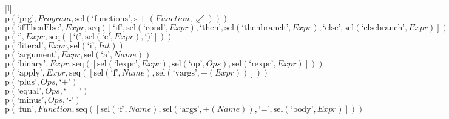 \footnotesize\begin{center}\begin{tabular}{|l|}\hline
{}
\\\hline
$\mathrm{p}(\text{`prg'},\mathit{Program},\mathrm{sel}\left(\text{`functions'},\mathrm{s}{+}\left(\mathit{Function},{\swarrow}\right)\right))$	\\
$\mathrm{p}(\text{`ifThenElse'},\mathit{Expr},\mathrm{seq}\left(\left[\text{`if'}, \mathrm{sel}\left(\text{`cond'},\mathit{Expr}\right), \text{`then'}, \mathrm{sel}\left(\text{`thenbranch'},\mathit{Expr}\right), \text{`else'}, \mathrm{sel}\left(\text{`elsebranch'},\mathit{Expr}\right)\right]\right))$	\\
$\mathrm{p}(\text{`'},\mathit{Expr},\mathrm{seq}\left(\left[\text{`('}, \mathrm{sel}\left(\text{`e'},\mathit{Expr}\right), \text{`)'}\right]\right))$	\\
$\mathrm{p}(\text{`literal'},\mathit{Expr},\mathrm{sel}\left(\text{`i'},\mathit{Int}\right))$	\\
$\mathrm{p}(\text{`argument'},\mathit{Expr},\mathrm{sel}\left(\text{`a'},\mathit{Name}\right))$	\\
$\mathrm{p}(\text{`binary'},\mathit{Expr},\mathrm{seq}\left(\left[\mathrm{sel}\left(\text{`lexpr'},\mathit{Expr}\right), \mathrm{sel}\left(\text{`op'},\mathit{Ops}\right), \mathrm{sel}\left(\text{`rexpr'},\mathit{Expr}\right)\right]\right))$	\\
$\mathrm{p}(\text{`apply'},\mathit{Expr},\mathrm{seq}\left(\left[\mathrm{sel}\left(\text{`f'},\mathit{Name}\right), \mathrm{sel}\left(\text{`vargs'},\plus \left(\mathit{Expr}\right)\right)\right]\right))$	\\
$\mathrm{p}(\text{`plus'},\mathit{Ops},\text{`+'})$	\\
$\mathrm{p}(\text{`equal'},\mathit{Ops},\text{`=='})$	\\
$\mathrm{p}(\text{`minus'},\mathit{Ops},\text{`-'})$	\\
$\mathrm{p}(\text{`fun'},\mathit{Function},\mathrm{seq}\left(\left[\mathrm{sel}\left(\text{`f'},\mathit{Name}\right), \mathrm{sel}\left(\text{`args'},\plus \left(\mathit{Name}\right)\right), \text{`='}, \mathrm{sel}\left(\text{`body'},\mathit{Expr}\right)\right]\right))$	\\
\hline\end{tabular}\end{center}



